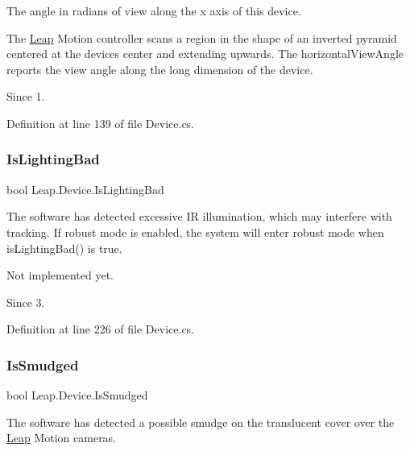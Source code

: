 The angle in radians of view along the x axis of this device. 

The \mbox{\hyperlink{namespace_leap}{Leap}} Motion controller scans a region in the shape of an inverted pyramid centered at the device\textquotesingle{}s center and extending upwards. The horizontal\+View\+Angle reports the view angle along the long dimension of the device.

\begin{DoxySince}{Since}
1. 
\end{DoxySince}


Definition at line 139 of file Device.\+cs.

\mbox{\label{class_leap_1_1_device_a38ea488cc97a098df9b65e9eb56577e5}} 
\subsubsection{\texorpdfstring{IsLightingBad}{IsLightingBad}}
{\footnotesize\ttfamily bool Leap.\+Device.\+Is\+Lighting\+Bad\hspace{0.3cm}{\ttfamily [get]}}



The software has detected excessive IR illumination, which may interfere with tracking. If robust mode is enabled, the system will enter robust mode when is\+Lighting\+Bad() is true. 

Not implemented yet. \begin{DoxySince}{Since}
3. 
\end{DoxySince}


Definition at line 226 of file Device.\+cs.

\mbox{\label{class_leap_1_1_device_a66b17a4d148ed209633678e473cf4258}} 
\subsubsection{\texorpdfstring{IsSmudged}{IsSmudged}}
{\footnotesize\ttfamily bool Leap.\+Device.\+Is\+Smudged\hspace{0.3cm}{\ttfamily [get]}}



The software has detected a possible smudge on the translucent cover over the \mbox{\hyperlink{namespace_leap}{Leap}} Motion cameras. 

